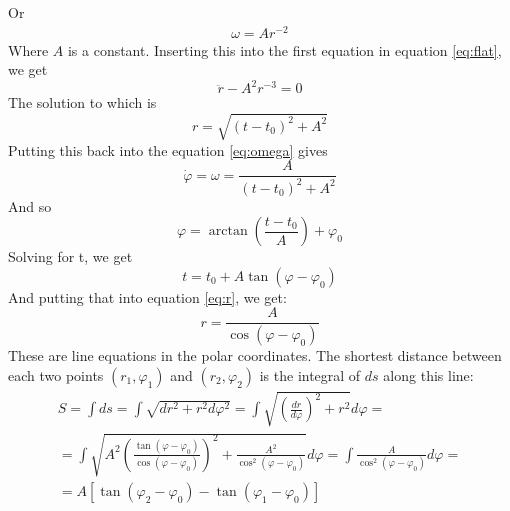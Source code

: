\documentclass{article}
\begin{document}
Or
\begin{eqnarray}
\label{eq:omega}
    \omega = A r^{-2}
\end{eqnarray}
Where $A$ is a constant. Inserting this into the first equation in equation \ref{eq:flat}, we get
\begin{equation}
    \ddot{r} - A^{2}r^{-3} = 0
\end{equation}
The solution to which is
\begin{equation}
\label{eq:r}
    r = \sqrt{(t - t_0)^2 + A^2}
\end{equation}
Putting this back into the equation \ref{eq:omega} gives
\begin{equation}
    \dot{\varphi} = \omega = \frac{A}{(t - t_0)^2 + A^2}    
\end{equation}
And so
\begin{equation}
    \varphi = \arctan(\frac{t - t_0}{A}) + \varphi_0
\end{equation}
Solving for t, we get
\begin{equation}
    t = t_0 + A\tan(\varphi - \varphi_0)
\end{equation}
And putting that into equation \ref{eq:r}, we get:
\begin{equation}
    r = \frac{A}{\cos(\varphi - \varphi_0)}
\end{equation}
These are line equations in the polar coordinates. The shortest distance between each two points $(r_1, \varphi_1)$ and $(r_2, \varphi_2)$ is the integral of $ds$ along this line:
\begin{equation}
\begin{gathered}
    S = \int ds = \int \sqrt{dr^2 + r^2d\varphi^2} = 
    \int \sqrt{\left(\frac{dr}{d\varphi}\right)^2 + r^2}d\varphi = 
    \\
    = \int \sqrt{A^2\left(\frac{\tan(\varphi - \varphi_0)}{\cos(\varphi - \varphi_0)}\right)^2 + \frac{A^2}{\cos^2(\varphi - \varphi_0)}}d\varphi
    = \int \frac{A}{\cos^2(\varphi - \varphi_0)} d\varphi = 
    \\
    = A \left[\tan(\varphi_2 - \varphi_0) - \tan(\varphi_1 - \varphi_0)\right]
\end{gathered}
\end{equation}
\end{document}
